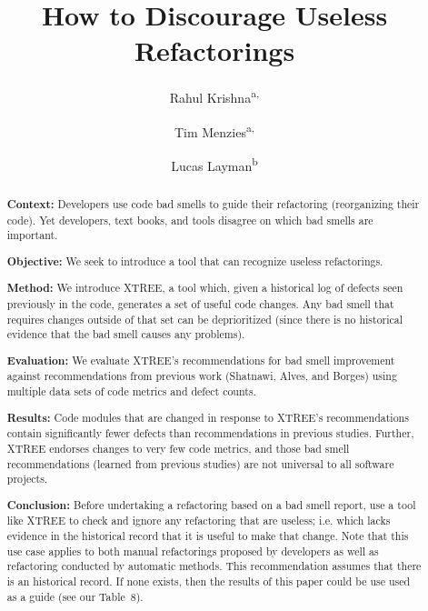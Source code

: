 \documentclass[twocolumn,5p]{elsarticle}
\theoremstyle{break}
\begin{document}
\begin{frontmatter}

\title{How to Discourage Useless Refactorings}

\author{Rahul Krishna\textsuperscript{a,}}
\author{Tim Menzies\textsuperscript{a,}}
\author{Lucas Layman\textsuperscript{b}}
\address{\textsuperscript{a}Department of Computer Science, North Carolina State University, Raleigh, NC, USA\\
\textsuperscript{b}Fraunhofer CESE, College Park, USA}

\begin{abstract} 
{\bf Context: } 
Developers use code bad smells to guide their refactoring (reorganizing their code).
Yet developers, text books, and tools disagree on which bad smells are important.

\noindent 
{\bf Objective: } We seek to introduce a tool that can recognize  useless refactorings.

\noindent
{\bf Method: } We introduce XTREE, a tool which, given a historical log of defects seen previously in the code, generates
a set of useful code changes.
Any bad smell that requires changes outside of that set can be deprioritized 
(since there is no
historical evidence that the bad smell causes any problems).

\noindent
{\bf Evaluation: } We evaluate XTREE's recommendations for bad smell improvement against recommendations from previous work (Shatnawi, Alves, and Borges) using multiple data sets of code metrics and defect counts.  

\noindent
{\bf Results: }Code modules that are changed in response to XTREE's recommendations contain significantly fewer defects than recommendations in previous studies. Further, XTREE endorses changes to very few code metrics, and those bad smell recommendations (learned from previous studies) are not universal to all  software projects.

\noindent
{\bf Conclusion: }
Before undertaking a refactoring based on a bad smell report,
use a tool like XTREE to check and ignore any refactoring   that  are useless; i.e. which lacks evidence
  in the historical record  that it is useful to make that change.
  Note that this use case applies to both manual refactorings proposed by developers
as well as refactoring  conducted by automatic methods.
This recommendation assumes that there is an historical record.
If none exists, then the results of this paper could be use used as a guide (see our
Table~8). 


\end{abstract}
\end{frontmatter}
\end{document}
